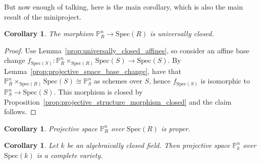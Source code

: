 \documentclass{scrartcl}
\renewcommand{\P}{\mathbb{P}}
\newcommand{\Spec}{\mathrm{Spec}}
\newtheorem{corollary}[subsection]{Corollary}
\theoremstyle{definition}
\begin{document}
But now enough of talking, here is the main corollary, which is also the main result of the miniproject.
\begin{corollary}
    The morphism $\P_R^n \to \Spec(R)$ is universally closed.
\end{corollary}
\begin{proof}
    Use Lemma~\ref{prop:universally_closed_affines}, so consider an affine base change $f_{\Spec(S)}: \P_R^n \times_{\Spec(R)} \Spec(S) \to \Spec(S)$.
    By Lemma~\ref{prop:projective_space_base_change}, have that $\P_R^n \times_{\Spec(R)} \Spec(S) \cong \P_S^n$ as schemes over $S$, hence $f_{\Spec(S)}$ is isomorphic to $\P_S^n \to \Spec(S)$.
    This morphism is closed by Proposition~\ref{prop:projective_structure_morphism_closed} and the claim follows.
\end{proof}
\begin{corollary}
    Projective space $\P_R^n$ over $\Spec(R)$ is proper.
\end{corollary}
\begin{corollary}
    Let $k$ be an algebraically closed field.
    Then projective space $\P_k^n$ over $\Spec(k)$ is a complete variety.
\end{corollary}
\end{document}
